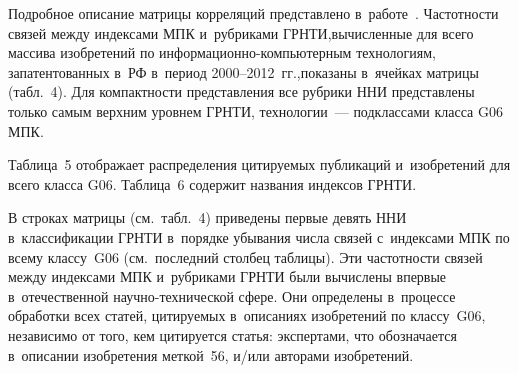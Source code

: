 \begin{multicols}{2}
  Подробное описание матрицы корреляций представлено в~работе~\cite{9-zat}.
Частотности связей между индексами МПК и~рубриками ГРНТИ,\linebreak вы\-чис\-лен\-ные для всего
массива изобретений по ин\-фор\-ма\-ци\-он\-но-компью\-тер\-ным технологиям,
запатентованных в~РФ в~период 2000--2012~гг.,\linebreak показаны в~ячейках матрицы (табл.~4). Для
ком\-пакт\-ности представления все рубрики ННИ представлены только самым
верхним уровнем ГРНТИ, технологии~--- подклассами класса G06 МПК.

  Таблица~5 отображает распределения цитируемых публикаций и~изобретений для всего
класса G06. Таблица~6 содержит названия индексов ГРНТИ.

  В строках матрицы (см.\ табл.~4) приведены первые девять ННИ
  в~классификации ГРНТИ в~порядке убывания числа связей с~индексами МПК по всему классу~G06 (см.\ последний
столбец таб\-ли\-цы). Эти частотности связей между индексами
 МПК и~руб\-ри\-ка\-ми ГРНТИ были
вычислены впервые в~отечественной на\-уч\-но-тех\-ни\-че\-ской сфере.
 Они определены в~процессе обработки всех статей, цитируемых в~описаниях изобретений по классу~G06,
независимо от того, кем цитируется статья:  экспертами, что обозначается в~описании
изобретения меткой~56, и/или авторами изобретений.
{

}

\end{multicols}

